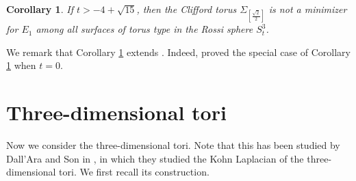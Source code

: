 \documentclass{amsart}
\theoremstyle{Corollary}
\newtheorem{cor}[theorem]{Corollary}
\numberwithin{equation}{section}
\begin{document}
\begin{cor}\label{cor8.2}
If $t>-4+\sqrt{15}$, then the Clifford torus $\Sigma_{[\frac{\sqrt{2}}{2}]}$
is not a minimizer for $E_1$ among all surfaces of torus type in the 
Rossi sphere $S^3_t$. 
\end{cor}


We remark that Corollary \ref{cor8.2} extends 
\cite[Corollary 1.4]{CCYZ}. Indeed, 
\cite[Corollary 1.4]{CCYZ} proved the special case of Corollary \ref{cor8.2}
when $t=0$.  
 

\section{Three-dimensional tori}\label{section9}


Now we consider the
three-dimensional tori. 
Note that this has been studied by Dall'Ara and Son in \cite{DS}, in which 
they studied the Kohn Laplacian of the three-dimensional tori.
We first recall its construction. 
\end{document}
